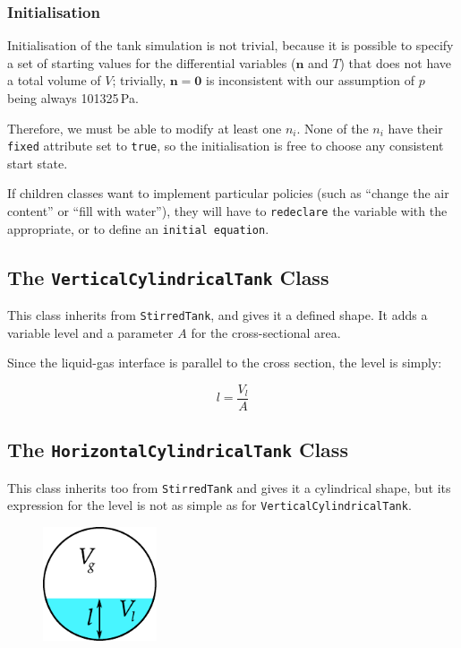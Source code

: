 \documentclass[a4paper]{article}
\begin{document}
\subsubsection{Initialisation}
Initialisation of the tank simulation is not trivial, because it is possible to
specify a set of starting values for the differential variables ($\mathbf{n}$
and $T$) that does not have a total volume of $V$; trivially, $\mathbf{n} =
\mathbf{0}$ is inconsistent with our assumption of $p$ being always 101325\,Pa.

Therefore, we must be able to modify at least one $n_i$. None of the $n_i$ have
their \texttt{fixed} attribute set to \texttt{true}, so the initialisation is
free to choose any consistent start state.

If children classes want to implement particular policies (such as ``change the
air content'' or ``fill with water''), they will have to \texttt{redeclare} the
variable with the appropriate, or to define an \texttt{initial equation}.

\subsection{The \texttt{VerticalCylindricalTank} Class}
This class inherits from \texttt{StirredTank}, and gives it a defined shape.
It adds a variable level and a parameter $A$ for the cross-sectional area.

Since the liquid-gas interface is parallel to the cross section, the level is
simply:

\begin{equation}
l = \frac{V_l}{A}
\end{equation}

\subsection{The \texttt{HorizontalCylindricalTank} Class}
This class inherits too from \texttt{StirredTank} and gives it a cylindrical
shape, but its expression for the level is not as simple as for
\texttt{VerticalCylindricalTank}.

\begin{figure}[h]
\centering
\includegraphics[width=0.3\textwidth]{pics/crosssection}
\end{figure}
\end{document}
